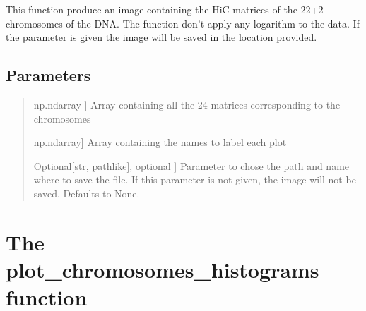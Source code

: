 \documentclass[letterpaper,10pt,english]{sphinxmanual}
\begin{document}
\begin{fulllineitems}
\label{\detokenize{index:hicanalysis.visualizegraph.plot_chromosome_hics}}
\pysigstartsignatures
{}
\pysigstopsignatures
\sphinxAtStartPar
This function produce an image containing the HiC matrices of the 22+2 chromosomes of the DNA.
The function don’t apply any logarithm to the data.
If the parameter  is given the image will be saved in the location provided.


\subsection{Parameters}
\label{\detokenize{index:id15}}\begin{quote}
\begin{description}
\sphinxlineitem{matrices}{[}np.ndarray {]}
\sphinxAtStartPar
Array containing all the 24 matrices corresponding to the chromosomes

\sphinxlineitem{names}{[}np.ndarray{]}
\sphinxAtStartPar
Array containing the names to label each plot

\sphinxlineitem{savepath}{[}Optional{[}str, path\sphinxhyphen{}like{]}, optional {]}
\sphinxAtStartPar
Parameter to chose the path and name where to save the file. If this
parameter is not given, the image will not be saved. Defaults to None.

\end{description}
\end{quote}

\end{fulllineitems}



\section{The plot\_chromosomes\_histograms function}
\label{\detokenize{index:the-plot-chromosomes-histograms-function}}
\end{document}
